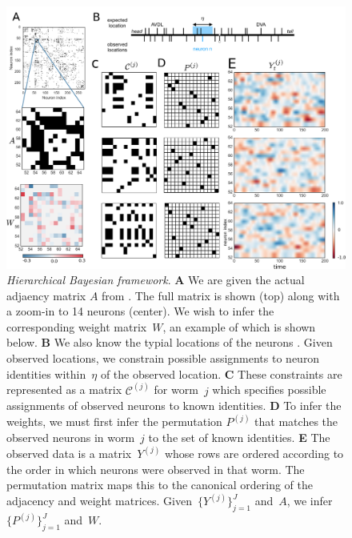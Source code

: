 \documentclass{article}
\begin{document}
\begin{figure}[t]
  \centering
  \includegraphics[width=5.0in]{Figure1.pdf} 
  \caption{\textit{Hierarchical Bayesian framework}.  \textbf{A} We
    are given the actual adjaency matrix $A$ from
    \citep{varshney2011structural}. The full matrix is shown (top)
    along with a zoom-in to 14 neurons (center).  We wish to infer the
    corresponding weight matrix~$W$, an example of which is shown
    below.  \textbf{B} We also know the typial locations of the
    neurons \citep{white1986structure,wormatlas}. Given observed
    locations, we constrain possible assignments to neuron identities
    within~$\eta$ of the observed location.  \textbf{C} These
    constraints are represented as a matrix $\mathcal{C}^{(j)}$ for
    worm~$j$ which specifies possible assignments of observed neurons
    to known identities.  \textbf{D} To infer the weights, we must
    first infer the permutation $P^{(j)}$ that matches the observed
    neurons in worm~$j$ to the set of known identities.
    \textbf{E} The observed data is a matrix~$Y^{(j)}$ whose rows
    are ordered according to the order in which neurons were observed
    in that worm.  The permutation matrix maps this to the canonical
    ordering of the adjacency and weight matrices. Given~$\{Y^{(j)}\}_{j=1}^J$ and~$A$, we infer~$\{P^{(j)}\}_{j=1}^J$ and~$W$.}
\label{fig:1}
\end{figure}
\end{document}
